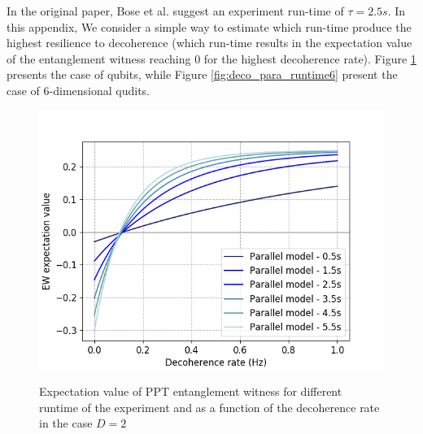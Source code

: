 \documentclass[%
 reprint,
 superscriptaddress,
 amsmath,
 amssymb,
 aps,
 longbibliography
]{revtex4-2}
\begin{document}
\begin{appendices}
\indent In the original paper, Bose et al. suggest an experiment run-time of $\tau=2.5s$. In this appendix, We consider a simple way to estimate which run-time produce the highest resilience to decoherence (which run-time results in the expectation value of the entanglement witness reaching $0$ for the highest decoherence rate). Figure \ref{fig:deco_para_runtime2} presents the case of qubits, while Figure \ref{fig:deco_para_runtime6} present the case of 6-dimensional qudits. 
	\begin{figure}
	\centering
		\includegraphics[width=1.0\columnwidth]{EW_para_deco_diff_time_d2.png}\par\medskip
	    \caption{Expectation value of PPT entanglement witness for different runtime of the experiment and as a function of the decoherence rate in the case $D=2$}\label{fig:deco_para_runtime2}
	\textit{}
	\end{figure}


\end{appendices}
\end{document}
